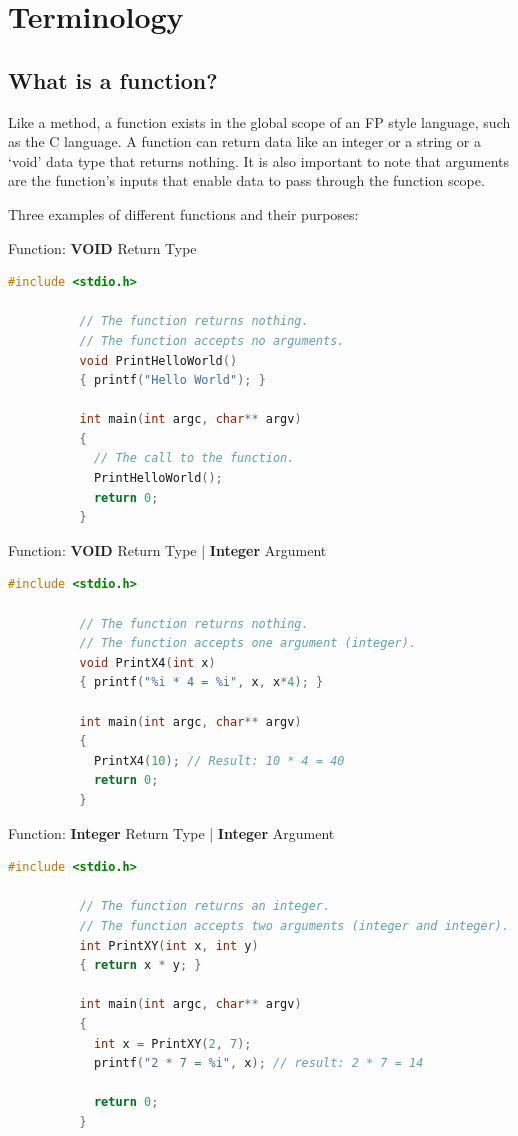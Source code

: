 \documentclass[10pt]{article}
\begin{document}
\newpage
\section{Terminology}
\label{sec:terminology}
    \subsection{What is a function?}
      Like a method, a function exists in the global scope of an FP style language, such as the C language. A function can return data like an integer or a string or a `void' data type that returns nothing. It is also important to note that arguments are the function's inputs that enable data to pass through the function scope.

      Three examples of different functions and their purposes:
      \begin{example}{Function: \textbf{VOID} Return Type}
        \begin{lstlisting}[language=c]
          #include <stdio.h>

          // The function returns nothing.
          // The function accepts no arguments.
          void PrintHelloWorld()
          { printf("Hello World"); }

          int main(int argc, char** argv)
          {
            // The call to the function.
            PrintHelloWorld();
            return 0;
          }
        \end{lstlisting}
      \end{example}

      \begin{example}{Function: \textbf{VOID} Return Type | \textbf{Integer} Argument}
        \begin{lstlisting}[language=c]
          #include <stdio.h>

          // The function returns nothing.
          // The function accepts one argument (integer).
          void PrintX4(int x)
          { printf("%i * 4 = %i", x, x*4); }

          int main(int argc, char** argv)
          {
            PrintX4(10); // Result: 10 * 4 = 40
            return 0;
          }
        \end{lstlisting}
      \end{example}

      \begin{example}{Function: \textbf{Integer} Return Type | \textbf{Integer} Argument}
        \begin{lstlisting}[language=c]
          #include <stdio.h>

          // The function returns an integer.
          // The function accepts two arguments (integer and integer).
          int PrintXY(int x, int y)
          { return x * y; }

          int main(int argc, char** argv)
          {
            int x = PrintXY(2, 7);
            printf("2 * 7 = %i", x); // result: 2 * 7 = 14

            return 0;
          }
        \end{lstlisting}
      \end{example}
\end{document}
